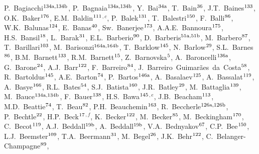 \begin{flushleft}
P.~Bagiacchi$^\textrm{\scriptsize 134a,134b}$,
P.~Bagnaia$^\textrm{\scriptsize 134a,134b}$,
Y.~Bai$^\textrm{\scriptsize 34a}$,
T.~Bain$^\textrm{\scriptsize 36}$,
J.T.~Baines$^\textrm{\scriptsize 133}$,
O.K.~Baker$^\textrm{\scriptsize 176}$,
E.M.~Baldin$^\textrm{\scriptsize 111}$$^{,c}$,
P.~Balek$^\textrm{\scriptsize 131}$,
T.~Balestri$^\textrm{\scriptsize 150}$,
F.~Balli$^\textrm{\scriptsize 86}$,
W.K.~Balunas$^\textrm{\scriptsize 124}$,
E.~Banas$^\textrm{\scriptsize 40}$,
Sw.~Banerjee$^\textrm{\scriptsize 173}$,
A.A.E.~Bannoura$^\textrm{\scriptsize 175}$,
H.S.~Bansil$^\textrm{\scriptsize 18}$,
L.~Barak$^\textrm{\scriptsize 31}$,
E.L.~Barberio$^\textrm{\scriptsize 90}$,
D.~Barberis$^\textrm{\scriptsize 51a,51b}$,
M.~Barbero$^\textrm{\scriptsize 87}$,
T.~Barillari$^\textrm{\scriptsize 103}$,
M.~Barisonzi$^\textrm{\scriptsize 164a,164b}$,
T.~Barklow$^\textrm{\scriptsize 145}$,
N.~Barlow$^\textrm{\scriptsize 29}$,
S.L.~Barnes$^\textrm{\scriptsize 86}$,
B.M.~Barnett$^\textrm{\scriptsize 133}$,
R.M.~Barnett$^\textrm{\scriptsize 15}$,
Z.~Barnovska$^\textrm{\scriptsize 5}$,
A.~Baroncelli$^\textrm{\scriptsize 136a}$,
G.~Barone$^\textrm{\scriptsize 24}$,
A.J.~Barr$^\textrm{\scriptsize 122}$,
F.~Barreiro$^\textrm{\scriptsize 84}$,
J.~Barreiro~Guimar\~{a}es~da~Costa$^\textrm{\scriptsize 58}$,
R.~Bartoldus$^\textrm{\scriptsize 145}$,
A.E.~Barton$^\textrm{\scriptsize 74}$,
P.~Bartos$^\textrm{\scriptsize 146a}$,
A.~Basalaev$^\textrm{\scriptsize 125}$,
A.~Bassalat$^\textrm{\scriptsize 119}$,
A.~Basye$^\textrm{\scriptsize 166}$,
R.L.~Bates$^\textrm{\scriptsize 54}$,
S.J.~Batista$^\textrm{\scriptsize 160}$,
J.R.~Batley$^\textrm{\scriptsize 29}$,
M.~Battaglia$^\textrm{\scriptsize 139}$,
M.~Bauce$^\textrm{\scriptsize 134a,134b}$,
F.~Bauer$^\textrm{\scriptsize 138}$,
H.S.~Bawa$^\textrm{\scriptsize 145}$$^{,e}$,
J.B.~Beacham$^\textrm{\scriptsize 113}$,
M.D.~Beattie$^\textrm{\scriptsize 74}$,
T.~Beau$^\textrm{\scriptsize 82}$,
P.H.~Beauchemin$^\textrm{\scriptsize 163}$,
R.~Beccherle$^\textrm{\scriptsize 126a,126b}$,
P.~Bechtle$^\textrm{\scriptsize 22}$,
H.P.~Beck$^\textrm{\scriptsize 17}$$^{,f}$,
K.~Becker$^\textrm{\scriptsize 122}$,
M.~Becker$^\textrm{\scriptsize 85}$,
M.~Beckingham$^\textrm{\scriptsize 170}$,
C.~Becot$^\textrm{\scriptsize 119}$,
A.J.~Beddall$^\textrm{\scriptsize 19b}$,
A.~Beddall$^\textrm{\scriptsize 19b}$,
V.A.~Bednyakov$^\textrm{\scriptsize 67}$,
C.P.~Bee$^\textrm{\scriptsize 150}$,
L.J.~Beemster$^\textrm{\scriptsize 109}$,
T.A.~Beermann$^\textrm{\scriptsize 31}$,
M.~Begel$^\textrm{\scriptsize 26}$,
J.K.~Behr$^\textrm{\scriptsize 122}$,
C.~Belanger-Champagne$^\textrm{\scriptsize 89}$,
$$
\end{flushleft}
